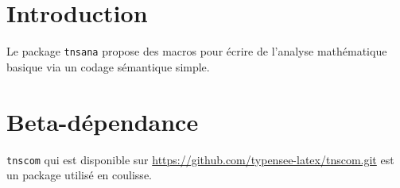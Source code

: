\documentclass[12pt,a4paper]{article}
\begin{document}
\section{Introduction}

Le package \verb+tnsana+ propose des macros pour écrire de l'analyse mathématique basique via un codage sémantique simple.

\section{Beta-dépendance}

\verb#tnscom# qui est disponible sur \url{https://github.com/typensee-latex/tnscom.git} est un package utilisé en coulisse.
\end{document}
